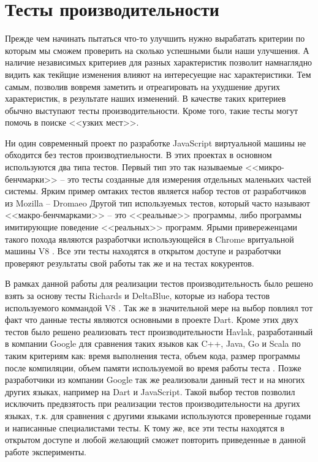 \chapter{Тесты производительности}

Прежде чем начинать пытаться что-то улучшить нужно вырабатать критерии по которым мы сможем проверить на сколько успешными были наши улучшения. А наличие независимых критериев для разных характеристик позволит намнаглядно видить как текйщие изменения влияют на интересуещие нас характеристики. Тем самым, позволив вовремя заметить и отреагировать на ухудшение других характеристик, в результате наших изменений.
В качестве таких критериев обычно выступают тесты производительности. Кроме того, такие тесты могут помочь в поиске <<узких мест>>.

Ни один современный проект по разработке JavaScript виртуальной машины не обходится без тестов производтиельности. В этих проектах в основном используются два типа тестов. Первый тип это так называемые <<микро-бенчмарки>> -- это тесты созданные для измерения отдельных маленьких частей системы. Ярким пример омтаких тестов является набор тестов от разработчиков из Mozilla -- Dromaeo \cite{Dromaeo}  Другой тип используемых тестов, который часто называют <<макро-бенчмарками>> -- это <<реальные>> программы, либо программы имитирующие поведение <<реальных>> программ. Ярыми привереженцами такого похода являются разработчки использующейся в Chrome вритуальной машины V8 \cite{V8:Benchmarks, Octane}. Все эти тесты находятся в открытом доступе и разработчки проверяют результаты свой работы так же и на тестах кокурентов.

В рамках данной работы для реализации тестов производительность было решено взять за основу тесты Richards и DeltaBlue, которые из набора тестов используемого коммандой V8 \cite{V8:Benchmarks}. Так же в значительной мере на выбор повлиял тот факт что данные тесты являются основными в проекте Dart.
Кроме этих двух тестов было решено реализовать тест производительности Havlak, разработанный в компании Google для сравнения таких языков как C++, Java, Go и Scala по таким критериям как: время выполнения теста, объем кода, размер программы после компиляции, объем памяти используемой во время работы теста \cite{HavlakBench}. Позже разработчики из компании Google так же реализовали данный тест и на многих других языках, например на Dart и JavaScript.
Такой выбор тестов позволил исключить предвзятость при реализации тестов производительности на других языках, т.к. для сравнения с другими языками используются проверенные годами и написанные специалистами тесты. К тому же, все эти тесты находятся в открытом доступе и любой желающий сможет повторить приведенные в данной работе эксперименты.

